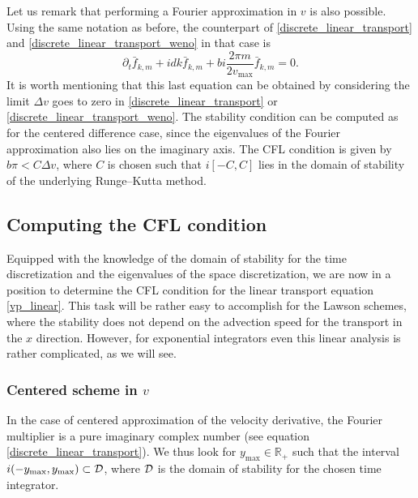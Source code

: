 \begin{remark}
  Let us remark that performing a Fourier approximation in $v$ is also possible. Using the same notation as before, the counterpart of \eqref{discrete_linear_transport} and \eqref{discrete_linear_transport_weno} in that case is
  $$
    \partial_t \bar{f}_{k,m} + i dk\bar{f}_{k,m} +b i \frac{2\pi m}{2 v_{\max}} \bar{f}_{k,m}= 0.
  $$
  It is worth mentioning that this last equation can be obtained by considering the limit $\Delta v$ goes to zero in  \eqref{discrete_linear_transport} or \eqref{discrete_linear_transport_weno}. The stability condition can be computed as for the centered difference case, since the eigenvalues of the Fourier approximation also lies on the imaginary axis. The CFL condition is given by $b \pi  < C \Delta v$, where $C$ is chosen such that $i [-C,C]$ lies in the domain of stability of the underlying Runge--Kutta method. 
\end{remark}



\subsection{Computing the CFL condition}

Equipped with the knowledge of the domain of stability for the time discretization and the eigenvalues of the space discretization, we are now in a position to determine the CFL condition for the linear transport equation \eqref{vp_linear}. This task will be rather easy to accomplish for the Lawson schemes, where the stability does not depend on the advection speed for the transport in the $x$ direction. However, for exponential integrators even this linear analysis is rather complicated, as we will see.


\subsubsection{Centered scheme in $v$}

In the case of centered approximation of the velocity derivative, the Fourier multiplier is a 
pure imaginary complex number (see equation \eqref{discrete_linear_transport}). We thus look for $y_{\max}\in \mathbb{R}_+$ such that the interval $i(-y_{\max},y_{\max}) \subset {\cal D}$, where ${\cal D}$ is the domain of stability for the chosen time integrator. 

